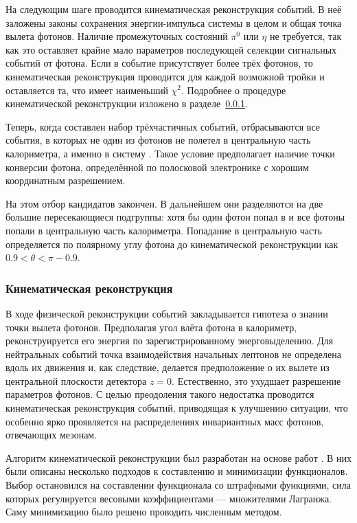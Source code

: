 На следующим шаге проводится кинематическая реконструкция событий.
В неё заложены законы сохранения энергии-импульса системы в целом и общая точка вылета фотонов.
Наличие промежуточных состояний $\pi^0$ или $\eta$ не требуется,
так как это оставляет крайне мало параметров последующей селекции сигнальных событий от фотона.
Если в событие присутствует более трёх фотонов,
то кинематическая реконструкция проводится для каждой возможной тройки и оставляется та,
что имеет наименьший $\chi^2$.
Подробнее о процедуре кинематической реконструкции изложено в разделе~\ref{sec:kf}.

Теперь, 
когда составлен набор трёхчастичных событий, 
отбрасываются все события, 
в которых не один из фотонов не полетел в центральную часть калориметра, 
а именно в систему . 
Такое условие предполагает наличие точки конверсии фотона,
определённой по полосковой электронике  с хорошим координатным разрешением.

На этом отбор кандидатов закончен. 
В дальнейшем они разделяются на две большие пересекающиеся подгруппы: 
хотя бы один фотон попал в  и все фотоны попали в центральную часть калориметра.
Попадание в центральную часть определяется по полярному углу фотона до кинематической реконструкции как $0.9 < \theta < \pi - 0.9$.



\subsubsection{Кинематическая реконструкция}
\label{sec:kf}

В ходе физической реконструкции событий закладывается гипотеза о знании точки вылета фотонов.
Предполагая угол влёта фотона в калориметр,
реконструируется его энергия по зарегистрированному энерговыделению.
Для нейтральных событий точка взаимодействия начальных лептонов не определена вдоль их движения и,
как следствие,
делается предположение о их вылете из центральной плоскости детектора $z = 0$.
Естественно,
это ухудшает разрешение параметров фотонов.
С целью преодоления такого недостатка проводится кинематическая реконструкция событий,
приводящая к улучшению ситуации,
что особенно ярко проявляется на распределениях инвариантных масс фотонов,
отвечающих мезонам.

Алгоритм кинематической реконструкции был разработан на основе работ \cite{Bukin2003-27, Bukin2005-51, Bukin2008-3}.
В них были описаны несколько подходов к составлению и минимизации функционалов.
Выбор остановился на составлении функционала со штрафными функциями,
сила которых регулируется весовыми коэффициентами
---
множителями Лагранжа.
Саму минимизацию было решено проводить численным методом.

